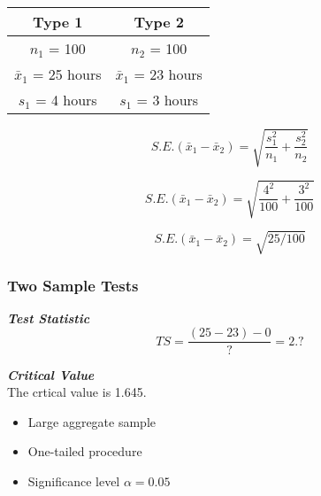 \documentclass{beamer}
\begin{document}

\begin{frame}
\begin{center}
\begin{tabular}{|c||c|}
\hline 
Type 1 & Type 2 \\ \hline \hline
$n_1$ = 100 & $n_2$ = 100 \\ \hline
$\bar{x}_1$ = 25 hours & $\bar{x}_1$ = 23 hours \\ \hline
$s_1$ = 4 hours & $s_1$ = 3 hours \\ \hline
\end{tabular} 
\end{center}
\end{frame}
\begin{frame}
\[ S.E.(\bar{x}_1 - \bar{x}_2)  = \sqrt{\frac{s^2_1}{n_1} + \frac{s^2_2}{n_2}}\]

\[ S.E.(\bar{x}_1 - \bar{x}_2)  = \sqrt{\frac{4^2}{100} + \frac{3^2}{100}}\]

\[ S.E.(\bar{x}_1 - \bar{x}_2)  =\sqrt{ 25/100}\]
\end{frame}

\begin{frame}
\frametitle{Two Sample Tests}
\noindent \textbf{\emph{Test Statistic}}
\[TS = \frac{(25-23) - 0}{?} = 2.?\]

\noindent \textbf{\emph{Critical Value}}\\
The crtical value is 1.645.
\begin{itemize}
\item Large aggregate sample
\item One-tailed procedure
\item Significance level $\alpha=0.05$
\end{itemize}

\end{frame}
\end{document}
